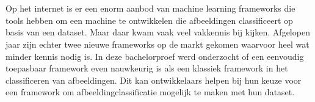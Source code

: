 
%
%

%



\chapter*{}

Op het internet is er een enorm aanbod van machine learning frameworks die tools hebben om een machine te ontwikkelen die afbeeldingen classificeert op basis van een dataset. Maar daar kwam vaak veel vakkennis bij kijken. Afgelopen jaar zijn echter twee nieuwe frameworks op de markt gekomen waarvoor heel wat minder kennis nodig is. In deze bachelorproef werd onderzocht of een eenvoudig toepasbaar framework even nauwkeurig is als een klassiek framework in het classificeren van afbeeldingen. Dit kan ontwikkelaars helpen bij hun keuze voor een framework om afbeeldingclassificatie mogelijk te maken met hun dataset. 

